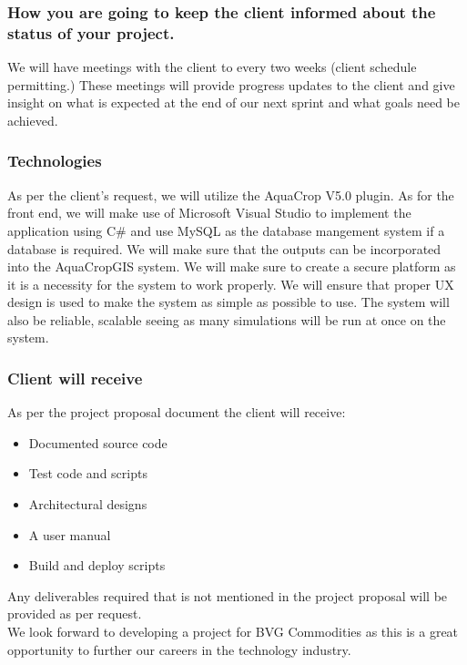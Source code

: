 \documentclass{article}
\begin{document}
	\subsubsection{How you are going to keep the client informed about the status of your project.}
	 We will have meetings with the client to every two weeks (client schedule permitting.) These meetings will provide progress updates to the client and give insight on what is expected at the end of our next sprint and what goals need be achieved. 
	
	\subsubsection{Technologies}
	 As per the client's request, we will utilize the AquaCrop V5.0 plugin. As for the front end, we will make use of Microsoft Visual Studio to implement the application using C# and use MySQL as the database mangement system if a database is required. We will make sure that the outputs can be incorporated into the AquaCropGIS system. We will make sure to create a secure platform as it is a necessity for the system to work properly. We will ensure that proper UX design is used to make the system as simple as possible to use. The system will also be reliable, scalable seeing as many simulations will be run at once on the system.
	
	\subsubsection{Client will receive}
	As per the project proposal document the client will receive:
	\begin{itemize}
		\item Documented source code
		\item Test code and scripts
		\item Architectural designs
		\item A user manual
		\item Build and deploy scripts
	\end{itemize}
	Any deliverables required that is not mentioned in the project proposal will be provided as per request.\\
	
	We look forward to developing a project for BVG Commodities as this is a great opportunity to further our careers in the technology industry.
\end{document}
